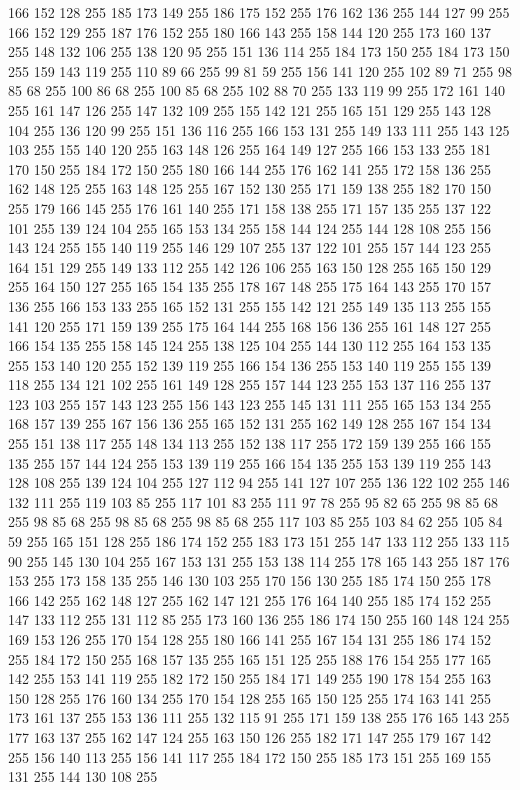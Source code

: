 166 152 128 255 185 173 149 255 186 175 152 255 176 162 136 255 144 127 99 255 166 152 129 255 187 176 152 255 180 166 143 255 158 144 120 255 173 160 137 255 148 132 106 255 138 120 95 255 151 136 114 255 184 173 150 255 184 173 150 255 159 143 119 255 110 89 66 255 99 81 59 255 156 141 120 255 102 89 71 255 98 85 68 255 100 86 68 255 100 85 68 255 102 88 70 255 133 119 99 255 172 161 140 255 161 147 126 255 147 132 109 255 155 142 121 255 165 151 129 255 143 128 104 255 136 120 99 255 151 136 116 255 166 153 131 255 149 133 111 255 143 125 103 255 155 140 120 255 163 148 126 255 164 149 127 255 166 153 133 255 181 170 150 255 184 172 150 255 180 166 144 255 176 162 141 255 172 158 136 255 162 148 125 255 163 148 125 255 167 152 130 255 171 159 138 255 182 170 150 255 179 166 145 255 176 161 140 255 171 158 138 255 171 157 135 255 137 122 101 255 139 124 104 255 165 153 134 255 158 144 124 255 144 128 108 255 156 143 124 255 155 140 119 255 146 129 107 255 137 122 101 255 157 144 123 255
164 151 129 255 149 133 112 255 142 126 106 255 163 150 128 255 165 150 129 255 164 150 127 255 165 154 135 255 178 167 148 255 175 164 143 255 170 157 136 255 166 153 133 255 165 152 131 255 155 142 121 255 149 135 113 255 155 141 120 255 171 159 139 255 175 164 144 255 168 156 136 255 161 148 127 255 166 154 135 255 158 145 124 255 138 125 104 255 144 130 112 255 164 153 135 255 153 140 120 255 152 139 119 255 166 154 136 255 153 140 119 255 155 139 118 255 134 121 102 255 161 149 128 255 157 144 123 255 153 137 116 255 137 123 103 255 157 143 123 255 156 143 123 255 145 131 111 255 165 153 134 255 168 157 139 255 167 156 136 255 165 152 131 255 162 149 128 255 167 154 134 255 151 138 117 255 148 134 113 255 152 138 117 255 172 159 139 255 166 155 135 255 157 144 124 255 153 139 119 255 166 154 135 255 153 139 119 255 143 128 108 255 139 124 104 255 127 112 94 255 141 127 107 255 136 122 102 255 146 132 111 255 119 103 85 255 117 101 83 255 111 97 78 255 95 82 65 255 98 85 68 255 98 85 68 255
98 85 68 255 98 85 68 255 117 103 85 255 103 84 62 255 105 84 59 255 165 151 128 255 186 174 152 255 183 173 151 255 147 133 112 255 133 115 90 255 145 130 104 255 167 153 131 255 153 138 114 255 178 165 143 255 187 176 153 255 173 158 135 255 146 130 103 255 170 156 130 255 185 174 150 255 178 166 142 255 162 148 127 255 162 147 121 255 176 164 140 255 185 174 152 255 147 133 112 255 131 112 85 255 173 160 136 255 186 174 150 255 160 148 124 255 169 153 126 255 170 154 128 255 180 166 141 255 167 154 131 255 186 174 152 255 184 172 150 255 168 157 135 255 165 151 125 255 188 176 154 255 177 165 142 255 153 141 119 255 182 172 150 255 184 171 149 255 190 178 154 255 163 150 128 255 176 160 134 255 170 154 128 255 165 150 125 255 174 163 141 255 173 161 137 255 153 136 111 255 132 115 91 255 171 159 138 255 176 165 143 255 177 163 137 255 162 147 124 255 163 150 126 255 182 171 147 255 179 167 142 255 156 140 113 255 156 141 117 255 184 172 150 255 185 173 151 255 169 155 131 255 144 130 108 255

